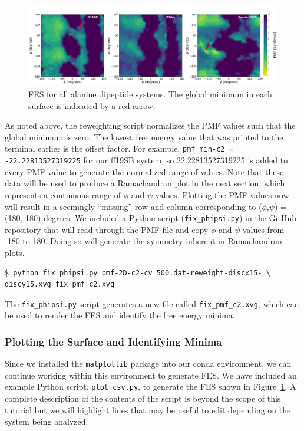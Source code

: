 \documentclass[9pt,tutorial]{livecoms}
\begin{document}
\begin{figure}[t]
    \includegraphics[scale=0.68]{main_figs/alad_allfes_500.png}
    \caption{FES for all alanine dipeptide systems. The global minimum in each surface is indicated by a red arrow.}
    \label{fig:alad_allffs}
\end{figure}

As noted above, the reweighting script normalizes the PMF values such that the global minimum is zero. The lowest free energy value that was printed to the terminal earlier is the offset factor. For example, \texttt{pmf\_min-c2 = -22.22813527319225} for our ff19SB system, so 22.22813527319225 is added to every PMF value to generate the normalized range of values. Note that these data will be used to produce a Ramachandran plot in the next section, which represents a continuous range of $\phi$ and $\psi$ values. Plotting the PMF values now will result in a seemingly ``missing'' row and column corresponding to ($\phi$,$\psi$) = (180, 180) degrees. We included a Python script (\texttt{fix\_phipsi.py}) in the GitHub repository that will read through the PMF file and copy $\phi$ and $\psi$ values from -180 to 180. Doing so will generate the symmetry inherent in Ramachandran plots. 

\begin{lstlisting}[style=MyBash]
$ python fix_phipsi.py pmf-2D-c2-cv_500.dat-reweight-discx15- \
discy15.xvg fix_pmf_c2.xvg
\end{lstlisting}

The \texttt{fix\_phipsi.py} script generates a new file called \texttt{fix\_pmf\_c2.xvg}, which can be used to render the FES and identify the free energy minima. 

\subsubsection{Plotting the Surface and Identifying Minima}
Since we installed the \texttt{matplotlib} package into our conda environment, we can continue working within this environment to generate FES. We have included an example Python script, \texttt{plot\_csv.py}, to generate the FES shown in Figure~\ref{fig:alad_allffs}. A complete description of the contents of the script is beyond the scope of this tutorial but we will highlight lines that may be useful to edit depending on the system being analyzed. 
\end{document}
